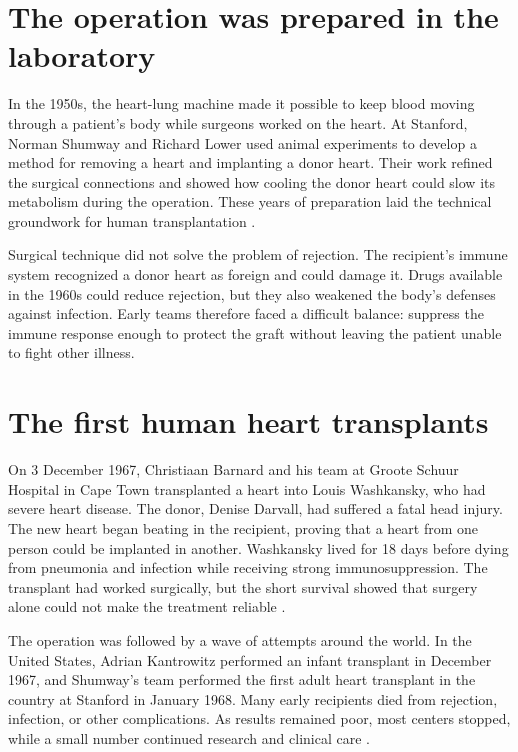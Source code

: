 \documentclass[12pt,oneside]{book}
\begin{document}
\section{The operation was prepared in the laboratory}
In the 1950s, the heart-lung machine made it possible to keep blood moving
through a patient's body while surgeons worked on the heart. At Stanford,
Norman Shumway and Richard Lower used animal experiments to develop a method
for removing a heart and implanting a donor heart. Their work refined the
surgical connections and showed how cooling the donor heart could slow its
metabolism during the operation. These years of preparation laid the
technical groundwork for human transplantation \cite{stanfordHeartHistory}.

Surgical technique did not solve the problem of rejection. The recipient's
immune system recognized a donor heart as foreign and could damage it. Drugs
available in the 1960s could reduce rejection, but they also weakened the
body's defenses against infection. Early teams therefore faced a difficult
balance: suppress the immune response enough to protect the graft without
leaving the patient unable to fight other illness.

\section{The first human heart transplants}
On 3 December 1967, Christiaan Barnard and his team at Groote Schuur Hospital
in Cape Town transplanted a heart into Louis Washkansky, who had severe heart
disease. The donor, Denise Darvall, had suffered a fatal head injury. The new
heart began beating in the recipient, proving that a heart from one person
could be implanted in another. Washkansky lived for 18 days before dying from pneumonia
and infection while receiving strong immunosuppression. The transplant had
worked surgically, but the short survival showed that surgery alone could not
make the treatment reliable \cite{capeTownHeartHistory}.

The operation was followed by a wave of attempts around the world. In the
United States, Adrian Kantrowitz performed an infant transplant in December
1967, and Shumway's team performed the first adult heart transplant in the
country at Stanford in January 1968. Many early recipients died from
rejection, infection, or other complications. As results remained poor,
most centers stopped, while a small number continued research and clinical
care \cite{heartTransplantReview,stanfordHeartHistory}.
\end{document}
